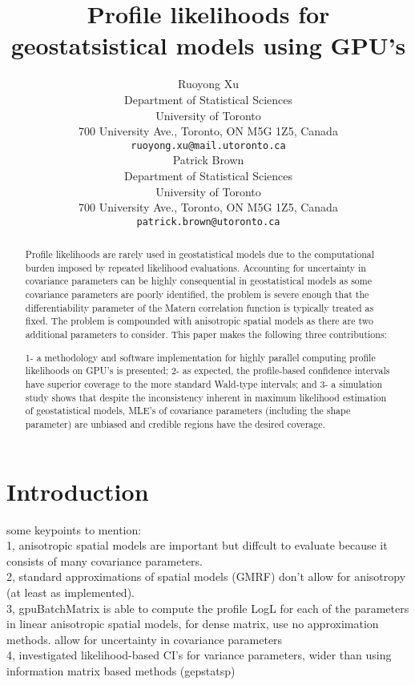 \documentclass{article}\usepackage[]{graphicx}\usepackage[]{color}
\title{Profile likelihoods for geostatsistical models using GPU's}
\date{}
\author{
  Ruoyong Xu\\
  Department of Statistical Sciences\\
  University of Toronto\\
  700 University Ave., Toronto, ON M5G 1Z5, Canada\\
  \texttt{ruoyong.xu@mail.utoronto.ca} \\
   \And
  Patrick Brown\\
  Department of Statistical Sciences\\
  University of Toronto\\
  700 University Ave., Toronto, ON M5G 1Z5, Canada\\
  \texttt{patrick.brown@utoronto.ca} \\
}
\begin{document}
\maketitle
{}



\begin{abstract}
Profile likelihoods are rarely used in geostatistical models due to the computational burden imposed by repeated likelihood evaluations.
Accounting for uncertainty in covariance parameters can be highly consequential in geostatistical models as some covariance parameters are poorly identified, 
the problem is severe enough that the differentiability parameter of the Matern correlation function is typically treated as fixed.  
The problem is compounded with anisotropic spatial models as there are two additional parameters to consider.  
This paper makes the following three contributions:

1- a methodology and software implementation for highly parallel
computing profile likelihoods on GPU's is presented;
2- as expected, the profile-based confidence intervals have superior
coverage to the more standard Wald-type intervals; and
3- a simulation study shows that despite the inconsistency inherent in
maximum likelihood estimation of geostatistical models, MLE's of covariance parameters (including the shape parameter) are unbiased and
credible regions have the desired coverage.

\end{abstract}




\section{Introduction}
some keypoints to mention:\\
1, anisotropic spatial models are important but diffcult to evaluate because it consists of many covariance parameters.\\
2, standard approximations of spatial models (GMRF) don’t allow for anisotropy (at least as implemented). \\
3, gpuBatchMatrix is able to compute the profile LogL for each of the parameters in linear anisotropic spatial models, for dense matrix, use no approximation methods. allow for uncertainty in covariance parameters\\
4, investigated likelihood-based CI’s for variance parameters, wider than using information matrix based methods (gepstatsp)\\
\end{document}
